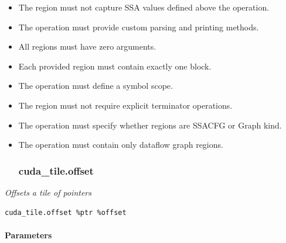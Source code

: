 \documentclass{article}
\begin{document}
\begin{itemize}
\item The region must not capture SSA values defined above the operation.
\item The operation must provide custom parsing and printing methods.
\item All regions must have zero arguments.
\item Each provided region must contain exactly one block.
\item The operation must define a symbol scope.
\item The region must not require explicit terminator operations.
\item The operation must specify whether regions are SSACFG or Graph kind.
\item The operation must contain only dataflow graph regions.


\subsubsection{cuda\_tile.offset}

\end{itemize}
\textit{Offsets a tile of pointers}


\begin{lstlisting}
cuda_tile.offset %ptr %offset
\end{lstlisting}

\paragraph{Parameters}
\end{document}
